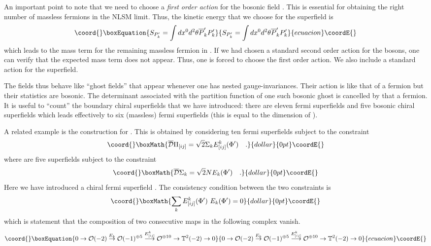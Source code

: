 \documentclass[a4paper,12pt]{article}
\def\Bbb{\mathbb}
\def\BT{\Bbb T}
\begin{document}
An important point to note that we need to choose a {\em first order
action} for the bosonic field \coordHE{}. This is essential for obtaining the right
number of massless fermions in the NLSM limit. Thus, the kinetic energy
that we choose for the superfield  \coordHE{} is
\begin{equation}\coord{}\boxEquation{
S_{P'_k} = \int dx^0 d^2\theta \overline{P}'_k P'_k
}{
S_{P'_k} = \int dx^0 d^2\theta \overline{P}'_k P'_k
}{ecuacion}\coordE{}\end{equation}
which leads to the mass term \coordHE{} for the
remaining massless fermion in \coordHE{}. If we had chosen a standard
second order action for the bosons, one can verify that the expected
mass term does not appear. Thus, one is forced to choose the first
order action. We also include a standard action for the \coordHE{} superfield. 

The \coordHE{} fields thus behave like ``ghost fields'' that appear whenever
one has nested gauge-invariances. Their action is like that of a fermion
but their statistics are bosonic. The determinant associated with
the partition function of one such bosonic ghost is cancelled by that
a fermion. 
It is useful to ``count'' the boundary chiral superfields that we have 
introduced:
there are eleven fermi superfields and five bosonic chiral superfields
which leads effectively to six (massless)
fermi superfields (this is equal to the dimension of \coordHE{}). 

A related example is the construction for \myHighlight{$\BT^2(-2)$}\coordHE{}. This is obtained
by considering ten fermi superfields \myHighlight{$\Pi_{[ij]}$}\coordHE{} subject to the
constraint 
$$\coord{}\boxMath{ 
\overline{\cal D} \Pi_{[ij]} = \sqrt2  \Sigma_k
E_{[ij]}^k(\Phi')\quad.
}{dollar}{0pt}\coordE{}$$
where \coordHE{} are five superfields subject to the constraint
$$\coord{}\boxMath{
\overline{\cal D} \Sigma_k = \sqrt2 N E_k(\Phi') \quad.
}{dollar}{0pt}\coordE{}$$
Here we have introduced a chiral fermi superfield \coordHE{}. The consistency
condition between the two constraints is
$$\coord{}\boxMath{
\sum_k E_{[ij]}^k(\Phi')\  E_k(\Phi') =0
}{dollar}{0pt}\coordE{}$$
which is statement that the composition of two consecutive maps in
the following complex vanish.
\begin{equation}\coord{}\boxEquation{
0\rightarrow {\cal O}(-2) \stackrel{E_k}{\rightarrow} {\cal O}(-1)^{\oplus5} 
\stackrel{E_{[ij]}^k}{\longrightarrow}
{\cal O}^{\oplus 10} \rightarrow \BT^2(-2)\rightarrow0
}{
0\rightarrow {\cal O}(-2) \stackrel{E_k}{\rightarrow} {\cal O}(-1)^{\oplus5} 
\stackrel{E_{[ij]}^k}{\longrightarrow}
{\cal O}^{\oplus 10} \rightarrow \BT^2(-2)\rightarrow0
}{ecuacion}\coordE{}\end{equation}
\end{document}
